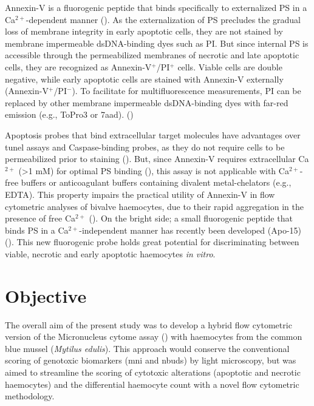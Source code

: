 Annexin-V is a fluorogenic peptide that binds specifically to externalized PS in a Ca$^{2+}$-dependent manner (\cite{Andree1990, Martin1995}). As the externalization of PS precludes the gradual loss of membrane integrity in early apoptotic cells, they are not stained by membrane impermeable dsDNA-binding dyes such as PI. But since internal PS is accessible through the permeabilized membranes of necrotic and late apoptotic cells, they are recognized as Annexin-V$^{+}$/PI$^{+}$ cells. Viable cells are double negative, while early apoptotic cells are stained with Annexin-V externally (Annexin-V$^{+}$/PI$^{-}$). To facilitate for multifluorescence measurements, PI can be replaced by other membrane impermeable dsDNA-binding dyes with far-red emission (e.g., ToPro3 or \acrshort{7aad}). (\cite{Jiang2016})

Apoptosis probes that bind extracellular target molecules have advantages over \acrshort{tunel} assays and Caspase-binding probes, as they do not require cells to be permeabilized prior to staining (\cite{DelBino1999}). But, since Annexin-V requires extracellular Ca$^{2+}$ (>1 mM) for optimal PS binding (\cite{Andree1990}), this assay is not applicable with Ca$^{2+}$-free buffers or anticoagulant buffers containing divalent metal-chelators (e.g., EDTA). This property impairs the practical utility of Annexin-V in flow cytometric analyses of bivalve haemocytes, due to their rapid aggregation in the presence of free Ca$^{2+}$ (\cite{Torreilles1999}). On the bright side; a small fluorogenic peptide that binds PS in a Ca$^{2+}$-independent manner has recently been developed (Apo-15) (\cite{Barth2020}). This new fluorogenic probe holds great potential for discriminating between viable, necrotic and early apoptotic haemocytes \emph{in vitro}.

\section{Objective}
The overall aim of the present study was to develop a hybrid flow cytometric version of the Micronucleus cytome assay (\cite{Bolognesi2012}) with haemocytes from the common blue mussel (\emph{Mytilus edulis}). This approach would conserve the conventional scoring of genotoxic biomarkers (\acrshort{mni} and \acrshort{nbuds}) by light microscopy, but was aimed to streamline the scoring of cytotoxic alterations (apoptotic and necrotic haemocytes) and the differential haemocyte count with a novel flow cytometric methodology. \newline

